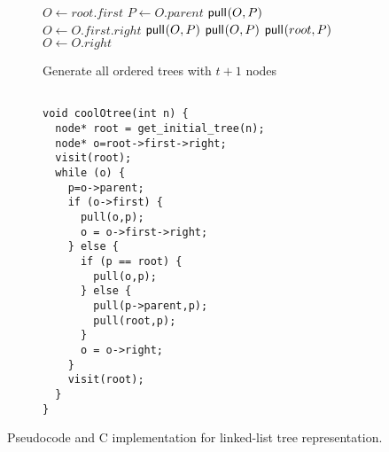 \begin{figure}[H]
    \centering
    \begin{subfigure}[t]{.49 \textwidth}
	\begin{center}
	    \begin{algorithm}[H] %
	    \begin{algorithmic}
	\State $O\gets root.first$
	\State {}
	    \State $P \gets O.parent$
		\State $\mathsf{pull}_{}(O,P)$
		\State $O \gets O.first.right$
	    \Else
		\State $\mathsf{pull}_{}(O,P)$
		\Else
		\State $\mathsf{pull}_{}(O,P)$
		\State $\mathsf{pull}_{}(root,P)$
		\EndIf
		\State $O \gets O.right$
	    \EndIf
	\State {}
        \EndWhile
    \EndFunction
	    \end{algorithmic}
    \caption*{Generate all ordered trees with $t+1$ nodes}
	\end{algorithm}
	\end{center}
	\label{fig:}
    \end{subfigure}
    \begin{subfigure}[t]{.5 \textwidth}
	\begin{center}
	    \vspace{.9em} %
\begin{Verbatim}[commandchars=\\\[\]]

void coolOtree(int n) {
  node* root = get_initial_tree(n);
  node* o=root->first->right;
  visit(root);
  while (o) {
    p=o->parent;
    if (o->first) {
      pull(o,p);
      o = o->first->right;
    } else {
      if (p == root) {
        pull(o,p);
      } else {
        pull(p->parent,p);
        pull(root,p);
      }
      o = o->right;
    }
    visit(root);
  }
}

\end{Verbatim}
	\end{center}
	\label{fig:}
    \end{subfigure}
    \cprotect\caption{Pseudocode and C implementation for linked-list tree representation.}
    \label{fig:otreeCode}
\end{figure}

